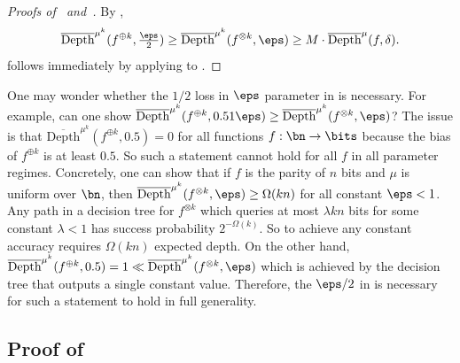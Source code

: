 \begin{proof}[Proofs of~ and~]
    By , $$\overline{\mathrm{Depth}}^{\mu^{k}}(f^{\oplus k},\tfrac{\eps}{2})\ge \overline{\mathrm{Depth}}^{\mu^{k}}(f^{\otimes k},\eps)\ge M\cdot\overline{\mathrm{Depth}}^{\mu}(f,\delta).$$
     follows immediately by applying  to .
\end{proof}

\begin{remark}
    \label{rem:loss}
    One may wonder whether the $1/2$ loss in $\eps$ parameter in  is necessary. For example, can one show $\overline{\mathrm{Depth}}^{\mu^{k}}(f^{\oplus k},0.51\eps)\ge \overline{\mathrm{Depth}}^{\mu^{k}}(f^{\otimes k},\eps)$? The issue is that $\overline{\mathrm{Depth}}^{\mu^{k}}(f^{\oplus k},0.5)=0$ for all functions $f:\bn\to\bits$ because the bias of $f^{\oplus k}$ is at least $0.5$. So such a statement cannot hold for all $f$ in all parameter regimes. Concretely, one can show that if $f$ is the parity of $n$ bits and $\mu$ is uniform over $\bn$, then $\overline{\mathrm{Depth}}^{\mu^{k}}(f^{\otimes k},\eps)\ge \Omega(kn)$ for all constant $\eps<1$. Any path in a decision tree for $f^{\otimes k}$ which queries at most $\lambda kn$ bits for some constant $\lambda<1$ has success probability $2^{-\Omega(k)}$. So to achieve any constant accuracy requires $\Omega(kn)$ expected depth. On the other hand, $\overline{\mathrm{Depth}}^{\mu^{k}}(f^{\oplus k},0.5)=1\ll \overline{\mathrm{Depth}}^{\mu^{k}}(f^{\otimes k},\eps)$ which is achieved by the decision tree that outputs a single constant value. Therefore, the $\eps/2$ in  is necessary for such a statement to hold in full generality.
\end{remark}



\subsection{Proof of~}



